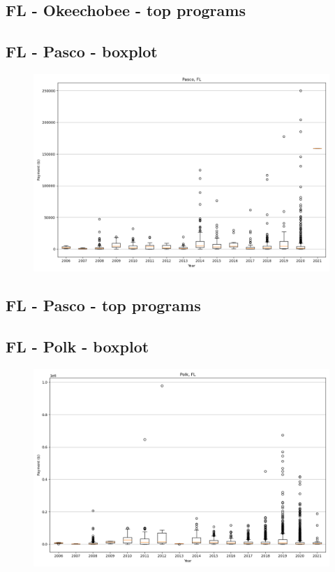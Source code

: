 \subsection*{FL - Okeechobee - top programs}

\newpage
\subsection*{FL - Pasco - boxplot}
\begin{figure}[h]
\centering
\includegraphics[width=7in]{../output/boxplots/counties/Pasco-FL_boxplot.png}
\end{figure}


\subsection*{FL - Pasco - top programs}

\newpage
\subsection*{FL - Polk - boxplot}
\begin{figure}[h]
\centering
\includegraphics[width=7in]{../output/boxplots/counties/Polk-FL_boxplot.png}
\end{figure}


